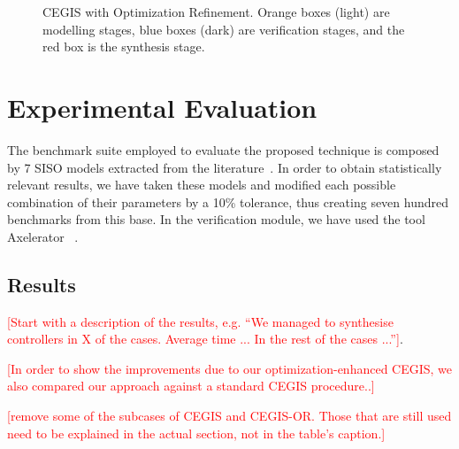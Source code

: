 \documentclass[sigconf]{llncs}
\renewcommand{\note}[1]{\textcolor{red}{[#1]}}
\begin{document}
\begin{figure}[t!]
{\begin{tikzpicture}[scale=0.3,->,>=stealth',shorten >=.2pt,auto, semithick, initial text=, ampersand replacement=\&,]

 \end{tikzpicture}
}
\caption{CEGIS with Optimization Refinement. Orange boxes (light) are modelling
stages, blue boxes (dark) are verification stages, and the red box is the synthesis stage.}
\label{fig:CEGIS-OR}
\end{figure}

\section{Experimental Evaluation}
\label{exp:evaluation}

The benchmark suite employed to evaluate the proposed technique is 
composed by 7 SISO models extracted from the literature~\cite{acrobot,cstr,CHEN1979389,KOKOTOVIC198023,gajic2008optimal,Franklin15,maglev,converters}.
In order to obtain statistically relevant results, we have taken these models
and modified each possible combination of their parameters by a 10\% tolerance,
thus creating seven hundred benchmarks from this base.
In the verification module, we have used the tool Axelerator~\cite{} .


\subsection{Results}
\label{exp:results}
\note{Start with a description of the results, e.g. ``We managed to synthesise controllers in X of the cases. Average time ... In the rest of the cases ...''}.

\note{In order to show the improvements due to our optimization-enhanced CEGIS, we also compared our approach against a standard CEGIS procedure..}

\note{remove some of the subcases of CEGIS and CEGIS-OR. Those that are still used need to be explained in the actual section, not in the table's caption.}
\end{document}
